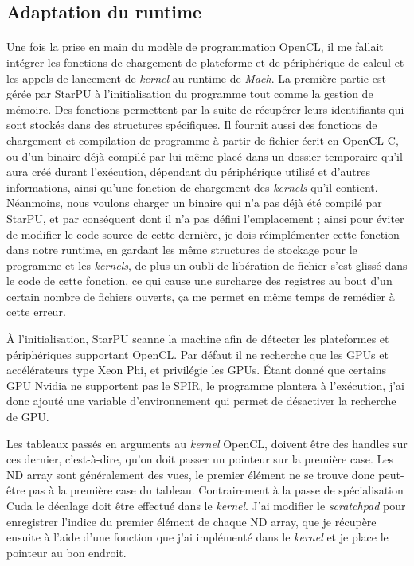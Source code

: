 \subsection{Adaptation du runtime}
\paragraph{}
Une fois la prise en main du modèle de programmation OpenCL, il me fallait
intégrer les fonctions de chargement de plateforme et de périphérique de calcul
et les appels de lancement de \emph{kernel} au runtime de \emph{Mach}. La
première partie est gérée par StarPU à l'initialisation du programme tout comme
la gestion de mémoire. Des fonctions permettent par la suite de récupérer leurs
identifiants qui sont stockés dans des structures spécifiques. Il fournit aussi
des fonctions de chargement et compilation de programme à partir de fichier
écrit en OpenCL C, ou d'un binaire déjà compilé par lui-même placé dans un
dossier temporaire qu'il aura créé durant l'exécution, dépendant du périphérique
utilisé et d'autres informations, ainsi qu'une fonction de chargement des
\emph{kernels} qu'il contient.\\
Néanmoins, nous voulons charger un binaire qui n'a pas déjà été compilé par
StarPU, et par conséquent dont il n'a pas défini l'emplacement ; ainsi pour
éviter de modifier le code source de cette dernière, je dois réimplémenter cette
fonction dans notre runtime, en gardant les même structures de stockage pour le
programme et les \emph{kernels}, de plus un oubli de libération de fichier s'est
glissé dans le code de cette fonction, ce qui cause une surcharge des registres
au bout d'un certain nombre de fichiers ouverts, ça me permet en même temps de
remédier à cette erreur.

À l'initialisation, StarPU scanne la machine afin de détecter les plateformes
et périphériques supportant OpenCL. Par défaut il ne recherche que les GPUs et
accélérateurs type Xeon Phi, et privilégie les GPUs. Étant donné que certains
GPU Nvidia ne supportent pas le SPIR, le programme plantera à l'exécution, j'ai
donc ajouté une variable d'environnement qui permet de désactiver la recherche
de GPU.

Les tableaux passés en arguments au \emph{kernel} OpenCL, doivent être des
handles sur ces dernier, c'est-à-dire, qu'on doit passer un pointeur sur la
première case. Les ND array sont généralement des vues, le premier élément ne se
trouve donc peut-être pas à la première case du tableau. Contrairement à la
passe de spécialisation Cuda le décalage doit être effectué dans le
\emph{kernel}. J'ai modifier le \emph{scratchpad} pour enregistrer l'indice du
premier élément de chaque ND array, que je récupère ensuite à l'aide d'une
fonction que j'ai implémenté dans le \emph{kernel} et je place le pointeur au
bon endroit.


